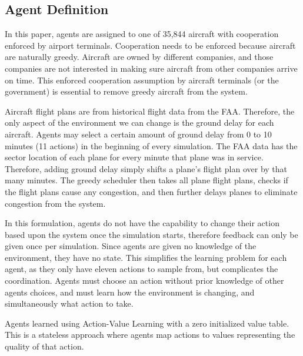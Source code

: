 \documentclass{aamas2014}
\begin{document}
\subsection{Agent Definition}
In this paper, agents are assigned to one of 35,844 aircraft with cooperation enforced by airport terminals. Cooperation needs to be enforced because aircraft are naturally greedy. Aircraft are owned by different companies, and those companies are not interested in making sure aircraft from other companies arrive on time. This enforced cooperation assumption by aircraft terminals (or the government) is essential to remove greedy aircraft from the system.

Aircraft flight plans are from historical flight data from the FAA. Therefore, the only aspect of the environment we can change is the ground delay for each aircraft. Agents may select a certain amount of ground delay from 0 to 10 minutes (11 actions) in the beginning of every simulation. The FAA data has the sector location of each plane for every minute that plane was in service. Therefore, adding ground delay simply shifts a plane's flight plan over by that many minutes. The greedy scheduler then takes all plane flight plans, checks if the flight plans cause any congestion, and then further delays planes to eliminate congestion from the system.

In this formulation, agents do not have the capability to change their action based upon the system once the simulation starts, therefore feedback can only be given once per simulation. Since agents are given no knowledge of the environment, they have no state. This simplifies the learning problem for each agent, as they only have eleven actions to sample from, but complicates the coordination. Agents must choose an action without prior knowledge of other agents choices, and must learn how the environment is changing, and simultaneously what action to take.

Agents learned using Action-Value Learning with a zero initialized value table. This is a stateless approach where agents map actions to values representing the quality of that action. 



\end{document}
